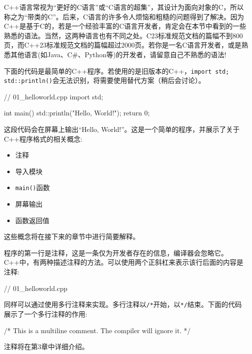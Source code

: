 
C++语言常视为“更好的C语言”或“C语言的超集”，其设计为面向对象的C，所以称之为“带类的C”。后来，C语言的许多令人烦恼和粗糙的问题得到了解决。因为C++是基于C的，若是一个经验丰富的C语言开发者，肯定会在本节中看到的一些熟悉的语法。当然，这两种语言也有不同之处。C23标准规范文档的篇幅不到800页，而C++23标准规范文档的篇幅超过2000页。若你是一名C语言开发者，或是熟悉其他语言(如Java、C\#、Python等)的开发者，请留意自己不熟悉的语法!


下面的代码是最简单的C++程序。若使用的是旧版本的C++，\verb|import std; std::println()|会无法识别，将需要使用替代方案（稍后会讨论）。

\begin{cpp}
// 01_helloworld.cpp
import std;

int main()
{
    std::println("Hello, World!");
    return 0;
}
\end{cpp}

这段代码会在屏幕上输出“Hello, World!”。这是一个简单的程序，并展示了关于C++程序格式的相关概念:

\begin{itemize}
\item
注释

\item
导入模块

\item
\verb|main()|函数

\item
屏幕输出

\item
函数返回值
\end{itemize}

这些概念将在接下来的章节中进行简要解释。


程序的第一行是注释，这是一条仅为开发者存在的信息，编译器会忽略它。C++中，有两种描述注释的方法。可以使用两个正斜杠来表示该行后面的内容是注释:

\begin{cpp}
// 01_helloworld.cpp
\end{cpp}

同样可以通过使用多行注释来实现。多行注释以\verb|/*|开始，以\verb|*/|结束。下面的代码展示了一个多行注释的作用:

\begin{cpp}
/* This is a multiline comment.
   The compiler will ignore it.
*/
\end{cpp}

注释将在第3章中详细介绍。

